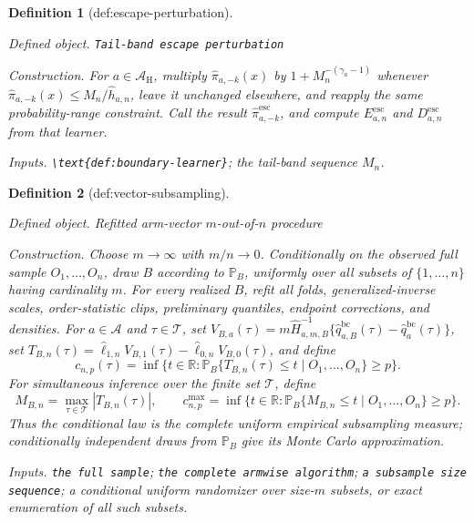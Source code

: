 \documentclass{article}
\newtheorem{definition}{Definition}
\begin{document}
\begin{definition}[def:escape-perturbation]\label{def:escape-perturbation}
\par\smallskip\noindent\emph{Defined object.} \texttt{Tail-\allowbreak{}band escape perturbation}
\par\smallskip\noindent\emph{Construction.} For \(a\in\mathcal A_{\mathrm H}\), multiply \(\widehat\pi_{a,-k}(x)\) by \(1+M_n^{-(\gamma_a-1)}\) whenever \(\widehat\pi_{a,-k}(x)\le M_n/\widehat h_{a,n}\), leave it unchanged elsewhere, and reapply the same probability-range constraint. Call the result \(\widehat\pi^{\mathrm{esc}}_{a,-k}\), and compute \(E^{\mathrm{esc}}_{a,n}\) and \(D^{\mathrm{esc}}_{a,n}\) from that learner.
\par\smallskip\noindent\emph{Inputs.} \texttt{\textbackslash{}\allowbreak{}text\{def:\allowbreak{}boundary-\allowbreak{}learner\}\allowbreak{}}; the tail-band sequence \(M_n\).
\end{definition}

\begin{definition}[def:vector-subsampling]\label{def:vector-subsampling}
\par\smallskip\noindent\emph{Defined object.} Refitted arm-vector \(m\)-out-of-\(n\) procedure
\par\smallskip\noindent\emph{Construction.} Choose \(m\to\infty\) with \(m/n\to0\). Conditionally on the observed full sample \(O_1,\ldots,O_n\), draw \(B\) according to \(\mathbb P_B\), uniformly over all subsets of \(\{1,\ldots,n\}\) having cardinality \(m\). For every realized \(B\), refit all folds, generalized-inverse scales, order-statistic clips, preliminary quantiles, endpoint corrections, and densities. For \(a\in\mathcal A\) and \(\tau\in\mathcal T\), set \(V_{B,a}(\tau)=m\widehat H_{a,m,B}^{-1}\{\widehat q_{a,B}^{\mathrm{bc}}(\tau)-\widehat q_a^{\mathrm{bc}}(\tau)\}\), set \(T_{B,n}(\tau)=\widehat\ell_{1,n}V_{B,1}(\tau)-\widehat\ell_{0,n}V_{B,0}(\tau)\), and define
\[
c_{n,p}(\tau)=\inf\{t\in\mathbb R:\mathbb P_B\{T_{B,n}(\tau)\le t\mid O_1,\ldots,O_n\}\ge p\}.
\]
For simultaneous inference over the finite set \(\mathcal T\), define
\[
M_{B,n}=\max_{\tau\in\mathcal T}|T_{B,n}(\tau)|,
\qquad
c^{\max}_{n,p}=\inf\{t\in\mathbb R:\mathbb P_B\{M_{B,n}\le t\mid O_1,\ldots,O_n\}\ge p\}.
\]
Thus the conditional law is the complete uniform empirical subsampling measure; conditionally independent draws from \(\mathbb P_B\) give its Monte Carlo approximation.
\par\smallskip\noindent\emph{Inputs.} \texttt{the full sample}; \texttt{the complete armwise algorithm}; \texttt{a subsample size sequence}; a conditional uniform randomizer over size-\(m\) subsets, or exact enumeration of all such subsets.
\end{definition}
\end{document}

